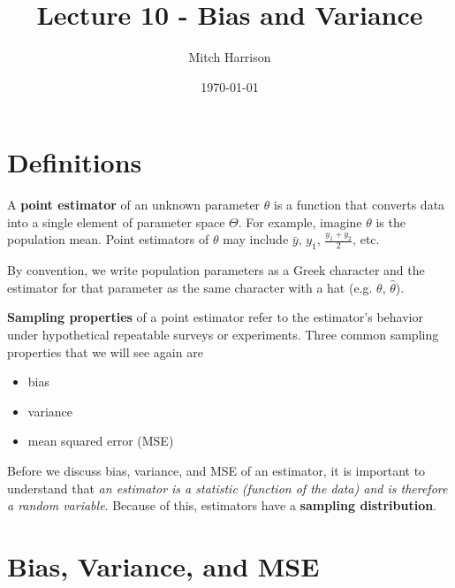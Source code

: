 \documentclass[titlepage, 12pt, leqno]{article}
\title{\Huge{Lecture 10 - Bias and Variance}}
\author{\large{Mitch Harrison}}
\date{\today}
\begin{document}
\setlength{\parskip}{1\baselineskip}
\setlength{\parindent}{15pt}
\maketitle
\tableofcontents
\newpage


\section{Definitions}

\begin{definition}
    A \textbf{point estimator} of an unknown parameter $\theta$ is a function that
    converts data into a single element of parameter space $\Theta$.
    For example, imagine $\theta$ is the population mean. Point estimators of $\theta$
    may include $\bar y$, $y_{1}$, $\frac{y_{1}+y_{2}}{2}$, etc.

    \begin{note}
        By convention, we write population parameters as a Greek character and the
        estimator for that parameter as the same character with a hat (e.g. $\theta$,
        $\hat \theta$).
    \end{note}
\end{definition}

\begin{definition}
    \textbf{Sampling properties} of a point estimator refer to the estimator's behavior
    under hypothetical repeatable surveys or experiments. Three common sampling 
    properties that we will see again are
    \begin{itemize}
        \item bias
        \item variance
        \item mean squared error (MSE)
    \end{itemize}
\end{definition}

Before we discuss bias, variance, and MSE of an estimator, it is important to understand
that \textit{an estimator is a statistic (function of the data) and is therefore a
random variable}. Because of this, estimators have a \textbf{sampling distribution}.

\pagebreak
\section{Bias, Variance, and MSE}
\end{document}
